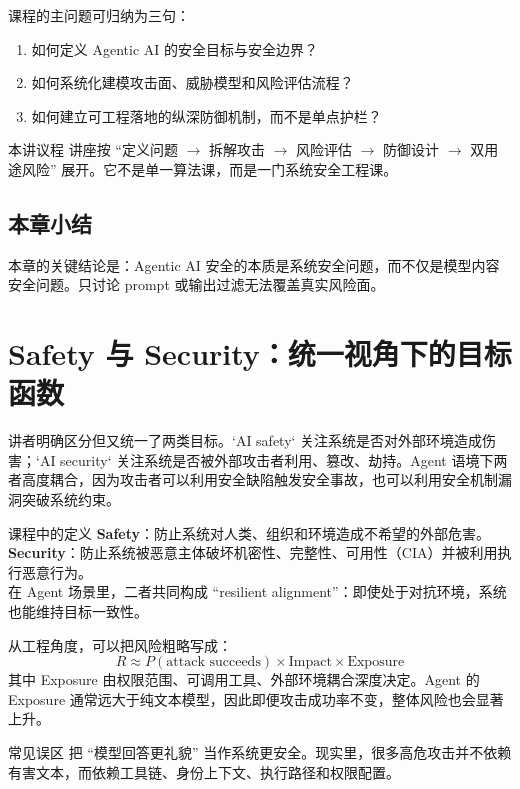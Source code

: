 \documentclass[a4paper]{article}
\begin{document}
课程的主问题可归纳为三句：
\begin{enumerate}
    \item 如何定义 Agentic AI 的安全目标与安全边界？
    \item 如何系统化建模攻击面、威胁模型和风险评估流程？
    \item 如何建立可工程落地的纵深防御机制，而不是单点护栏？
\end{enumerate}

\begin{knowledgebox}{本讲议程}
讲座按 ``定义问题 $\rightarrow$ 拆解攻击 $\rightarrow$ 风险评估 $\rightarrow$ 防御设计 $\rightarrow$ 双用途风险'' 展开。它不是单一算法课，而是一门系统安全工程课。
\end{knowledgebox}

\subsection{本章小结}
本章的关键结论是：Agentic AI 安全的本质是系统安全问题，而不仅是模型内容安全问题。只讨论 prompt 或输出过滤无法覆盖真实风险面。

\section{Safety 与 Security：统一视角下的目标函数}

讲者明确区分但又统一了两类目标。`AI safety` 关注系统是否对外部环境造成伤害；`AI security` 关注系统是否被外部攻击者利用、篡改、劫持。Agent 语境下两者高度耦合，因为攻击者可以利用安全缺陷触发安全事故，也可以利用安全机制漏洞突破系统约束。

\begin{knowledgebox}{课程中的定义}
\textbf{Safety}：防止系统对人类、组织和环境造成不希望的外部危害。\\
\textbf{Security}：防止系统被恶意主体破坏机密性、完整性、可用性（CIA）并被利用执行恶意行为。\\
在 Agent 场景里，二者共同构成 ``resilient alignment''：即使处于对抗环境，系统也能维持目标一致性。
\end{knowledgebox}

从工程角度，可以把风险粗略写成：
$$
R \approx P(\text{attack succeeds}) \times \text{Impact} \times \text{Exposure}
$$
其中 Exposure 由权限范围、可调用工具、外部环境耦合深度决定。Agent 的 Exposure 通常远大于纯文本模型，因此即便攻击成功率不变，整体风险也会显著上升。

\begin{warningbox}{常见误区}
把 ``模型回答更礼貌'' 当作系统更安全。现实里，很多高危攻击并不依赖有害文本，而依赖工具链、身份上下文、执行路径和权限配置。
\end{warningbox}
\end{document}
